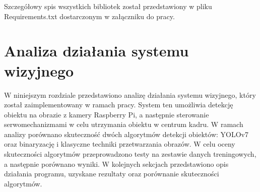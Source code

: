 \documentclass[a4paper,twoside,12pt]{book}
\begin{document}
Szczegółowy spis wszystkich bibliotek został przedstawiony w pliku Requirements.txt dostarczonym w załączniku do pracy.









%      


\chapter{Analiza działania systemu wizyjnego}
\label{ch:05}
W niniejszym rozdziale przedstawiono analizę działania systemu wizyjnego, który został zaimplementowany w ramach pracy. System ten umożliwia detekcję obiektu na obrazie z kamery Raspberry Pi, a następnie sterowanie serwomechanizmami w celu utrzymania obiektu w centrum kadru. W ramach analizy porównano skuteczność dwóch algorytmów detekcji obiektów: YOLOv7 oraz binaryzację i klasyczne techniki przetwarzania obrazów. W celu oceny skuteczności algorytmów przeprowadzono testy na zestawie danych treningowych, a następnie porównano wyniki. W kolejnych sekcjach przedstawiono opis działania programu, uzyskane rezultaty oraz porównanie skuteczności algorytmów.
\end{document}
